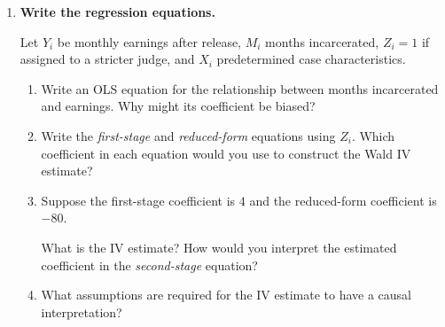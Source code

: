 \documentclass[11pt]{article}
\newif\ifinstructor
\newcommand{\answer}[1]{%
\ifinstructor
\par\smallskip\noindent
{\color{blue!55!black}\small
\textbf{Suggested answer:} #1}
\par
\fi
}
\begin{document}
\begin{enumerate}[resume]
\begin{enumerate}[label=(\alph*)]
\end{enumerate}

\item \textbf{Write the regression equations.}

Let $Y_i$ be monthly earnings after release,
$M_i$ months incarcerated,
$Z_i=1$ if assigned to a stricter judge,
and $X_i$ predetermined case characteristics.

\begin{enumerate}[label=(\alph*)]

\item Write an OLS equation for the relationship between months
incarcerated and earnings. Why might its coefficient be biased?

\answer{
A suitable equation is
$Y_i=\alpha+\beta M_i+X_i'\gamma+u_i$.
Sentence length may be correlated with unobserved offense severity,
criminal history, or labor-market prospects, so OLS need not recover
a causal effect.
}
\vspace{3.0cm}

\item Write the \emph{first-stage} and \emph{reduced-form}
equations using $Z_i$.
Which coefficient in each equation would you use to construct
the Wald IV estimate?

\answer{
First stage:
$M_i=\pi_0+\pi_1 Z_i+X_i'\pi_2+v_i$.

Reduced form:
$Y_i=\rho_0+\rho_1 Z_i+X_i'\rho_2+e_i$.

In the binary-judge example, the IV estimate is
$\rho_1/\pi_1$.
Relevance requires $\pi_1\neq0$.
}
\vspace{3.0cm}


\item Suppose the first-stage coefficient is $4$ and the
reduced-form coefficient is $-80$.

What is the IV estimate?
How would you interpret the estimated coefficient in the
\emph{second-stage} equation?

\answer{
The IV estimate is $-80/4=-20$.
The second-stage coefficient is a \$20 reduction in monthly
post-release earnings per additional month of incarceration,
for the sentencing margins shifted by the instrument,
under the IV assumptions.
These are hypothetical values.
An IV equals LATE under IV assumptions: relevance, independence, exclusion restriction, and monotonicity.
}
\vspace{3.0cm}


\item What assumptions are required for the IV estimate to have a causal interpretation?

\answer{
The instrument must be relevant (affect treatment), independent (as good as random conditional on covariates), and satisfy the exclusion restriction (affect the outcome only through treatment). 
Monotonicity is also needed for LATE interpretation.
}


\vspace{3cm}

\end{enumerate}

\end{enumerate}
\newpage
\end{document}
